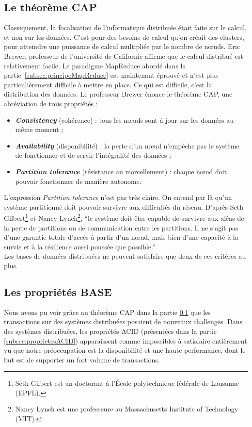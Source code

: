 \subsection{Le théorème CAP}
\label{subsec:theoremeCAP}
	Classiquement, la focalisation de l'informatique distribuée était faite sur le calcul, et non sur les données. C'est pour des besoins de calcul qu'on créait des clusters, pour atteindre une puissance de calcul multipliée par le nombre de nœuds. Eric Brewer, professeur de l'université de Californie affirme que le calcul distribué est relativement facile. Le paradigme MapReduce abordé dans la partie~\ref{subsec:principeMapReduce} est maintenant éprouvé et n'est plus particulièrement difficile à mettre en place. Ce qui est difficile, c'est la distribution des données. Le professeur Brewer énonce le théorème CAP, une abréviation de trois propriétés :
	\vspace{10px}
	\begin{itemize}
		\item \textbf{\textit{Consistency}} (cohérence) : tous les nœuds sont à jour sur les données au même moment ; 
		\item \textbf{\textit{Availability}} (disponibilité) : la perte d'un nœud n'empêche pas le système de fonctionner et de servir l'intégralité des données ; 
		\item \textbf{\textit{Partition tolerance}} (résistance au morcellement) : chaque nœud doit pouvoir fonctionner de manière autonome. 
	\end{itemize}
	\vspace{20px}
	L'expression \textit{Partition tolerance} n'est pas très claire. On entend par là qu'un système partitionné doit pouvoir survivre aux difficultés du réseau. D'après Seth Gilbert\footnote{Seth Gilbert est un doctorant à l'École polytechnique fédérale de Lausanne (EPFL).} et Nancy Lynch\footnote{Nancy Lynch est une professeure au Massachusetts Institute of Technology (MIT).}, \enquote{le système doit être capable de survivre aux aléas de la perte de partitions ou de communication entre les partitions. Il ne s'agit pas d'une garantie totale d'accès à partir d'un nœud, mais bien d'une capacité à la survie et à la résilience aussi poussée que possible.}\\

	Les bases de données distribuées ne peuvent satisfaire que deux de ces critères au plus.

\subsection{Les propriétés BASE}
	Nous avons pu voir grâce au théorème CAP dans la partie \ref{subsec:theoremeCAP} que les transactions sur des systèmes distribuées posaient de nouveaux challenges. Dans des systèmes distribuées, les propriétés ACID (présentées dans la partie \ref{subsec:proprietesACID}) apparaissent comme impossibles à satisfaire entièrement vu que notre préoccupation est la disponibilité et une haute performance, dont le but est de supporter un fort volume de transactions.\\

